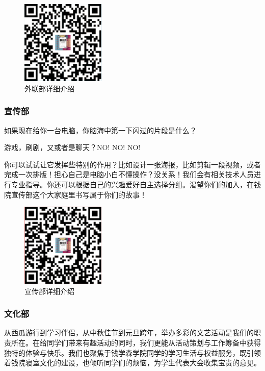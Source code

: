 \documentclass[
decoration,  %
]{qyxf-book}
\begin{document}
	\begin{figure}[htbp]
	\centering
	\includegraphics[width=4cm]{pics/wlbqrcode.png}
	\setlength{\abovecaptionskip}{0.0cm}
	\setlength{\belowcaptionskip}{0.2cm}
	\caption*{外联部详细介绍}
	\end{figure}	
		

	\subsubsection{宣传部}
	如果现在给你一台电脑，你脑海中第一下闪过的片段是什么？
	
    游戏，刷剧，又或者是聊天？NO! NO! NO!
    
    你可以试试让它发挥些特别的作用？比如设计一张海报，比如剪辑一段视频，或者完成一次排版！担心自己是电脑小白不懂操作？没关系！我们会有相关技术人员进行专业指导。你还可以根据自己的兴趣爱好自主选择分组。渴望你们的加入，在钱院宣传部这个大家庭里书写属于你们的故事！

	\begin{figure}[htbp]
	\centering
	\includegraphics[width=4cm]{pics/xcb.png}
	\setlength{\abovecaptionskip}{0.0cm}
	\setlength{\belowcaptionskip}{0.2cm}
	\caption*{宣传部详细介绍}
	\end{figure}	
    	
	\subsubsection{文化部}
	从西瓜游行到学习伴侣，从中秋佳节到元旦跨年，举办多彩的文艺活动是我们的职责所在。在给同学们带来有趣活动的同时，我们更能从活动策划与工作筹备中获得独特的体验与快乐。我们也聚焦于钱学森学院同学的学习生活与权益服务，既引领着钱院寝室文化的建设，也倾听同学们的烦恼，为学生代表大会收集宝贵的意见。
	
\end{document}
